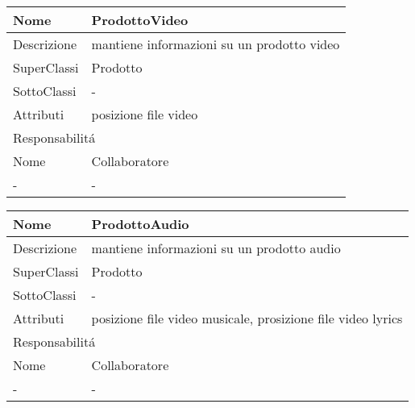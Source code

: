 \begin{center} %
    \begin{longtable}{ |p{3cm}|p{3cm}|p{3cm}|p{3cm}| }
        \hline
        Nome & \multicolumn{3}{|p{9cm}|}{ProdottoVideo} \\\hline
        Descrizione & \multicolumn{3}{|p{9cm}|}{mantiene informazioni su un prodotto video} \\\hline
        SuperClassi & \multicolumn{3}{|p{9cm}|}{Prodotto} \\\hline
        SottoClassi & \multicolumn{3}{|p{9cm}|}{-} \\\hline
        Attributi & \multicolumn{3}{|p{9cm}|}{posizione file video} \\\hline
        \multicolumn{4}{|p{12cm}|}{Responsabilit\'a} \\\hline %
        \multicolumn{2}{|p{6cm}|}{Nome} & \multicolumn{2}{|p{6cm}|}{Collaboratore} \\\hline
        \multicolumn{2}{|p{6cm}|}{-} & \multicolumn{2}{|p{6cm}|}{-} \\\hline
    \end{longtable}
\end{center}

\begin{center} %
    \begin{longtable}{ |p{3cm}|p{3cm}|p{3cm}|p{3cm}| }
        \hline
        Nome & \multicolumn{3}{|p{9cm}|}{ProdottoAudio} \\\hline
        Descrizione & \multicolumn{3}{|p{9cm}|}{mantiene informazioni su un prodotto audio} \\\hline
        SuperClassi & \multicolumn{3}{|p{9cm}|}{Prodotto} \\\hline
        SottoClassi & \multicolumn{3}{|p{9cm}|}{-} \\\hline
        Attributi & \multicolumn{3}{|p{9cm}|}{posizione file video musicale, prosizione file video lyrics} \\\hline
        \multicolumn{4}{|p{12cm}|}{Responsabilit\'a} \\\hline %
        \multicolumn{2}{|p{6cm}|}{Nome} & \multicolumn{2}{|p{6cm}|}{Collaboratore} \\\hline
        \multicolumn{2}{|p{6cm}|}{-} & \multicolumn{2}{|p{6cm}|}{-} \\\hline
    \end{longtable}
\end{center}

